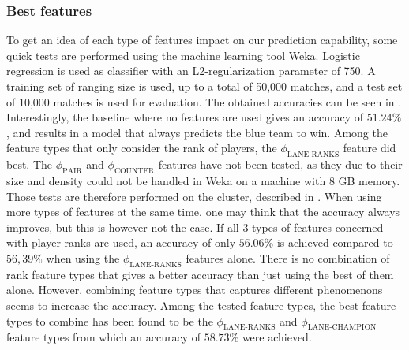 \subsubsection{Best features}
\label{sec:best-features}
To get an idea of each type of features impact on our prediction capability, some quick tests are performed using the machine learning tool Weka.
Logistic regression is used as classifier with an L2-regularization parameter of 750. A training set of ranging size is used, up to a total of 50,000 matches, and a test set of 10,000 matches is used for evaluation.
The obtained accuracies can be seen in .
Interestingly, the baseline where no features are used gives an accuracy of $51.24 \%$, and results in a model that always predicts the blue team to win.
Among the feature types that only consider the rank of players, the $\phi_\text{LANE-RANKS}$ feature did best.
The $\phi_\text{PAIR}$ and $\phi_\text{COUNTER}$ features have not been tested, as they due to their size and density could not be handled in Weka on a machine with 8 GB memory.
Those tests are therefore performed on the cluster, described in .
When using more types of features at the same time, one may think that the accuracy always improves, but this is however not the case.
If all 3 types of features concerned with player ranks are used, an accuracy of only $56.06 \%$ is achieved compared to $56,39 \%$ when using the $\phi_\text{LANE-RANKS}$ features alone. There is no combination of rank feature types that gives a better accuracy than just using the best of them alone.
However, combining feature types that captures different phenomenons seems to increase the accuracy.
Among the tested feature types, the best feature types to combine has been found to be the $\phi_\text{LANE-RANKS}$ and $\phi_\text{LANE-CHAMPION}$ feature types from which an accuracy of $58.73 \%$ were achieved.


